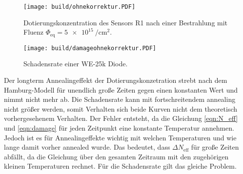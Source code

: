 \begin{figure}
    \texttt{[image: build/ohnekorrektur.PDF]}
    \caption{Dotierungskonzentration des Sensors R1 nach einer Bestrahlung mit Fluenz $\Phi_{\mathrm{eq}} = \SI{5e15}{\per\centi\meter\squared}.$}
    \label{fig:N_eff_ohne}
\end{figure}

\begin{figure}
    \texttt{[image: build/damageohnekorrektur.PDF]}
    \caption{Schadensrate einer WE-25k Diode.}
    \label{fig:damage_ohne}
\end{figure}


Der longterm Annealingeffekt der Dotierungskonzetration strebt nach dem Hamburg-Modell
für unendlich große Zeiten gegen einen konstanten Wert und nimmt nicht mehr
ab. Die Schadensrate kann mit fortschreitendem annealing nicht
größer werden, somit Verhalten sich beide Kurven nicht dem theoretisch
vorhergesehenem Verhalten.
Der Fehler entsteht, da die Gleichung \ref{eqn:N_eff} und \ref{eqn:damage} für jeden
Zeitpunkt eine konstante Temperatur annehmen. Jedoch ist es für Annealingeffekte
wichtig mit welchen Temperaturen und wie lange damit vorher annealed wurde.
Das bedeutet, dass $\Delta N_{\mathrm{eff}}$ für große Zeiten abfällt, da die Gleichung über den
gesamten Zeitraum mit den zugehörigen kleinen Temperaturen rechnet. Für
die Schadensrate gilt das gleiche Problem.

